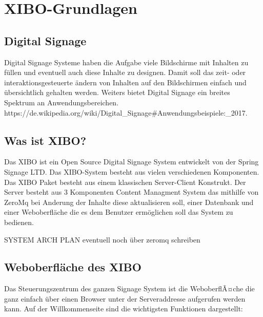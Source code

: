 \chapter{XIBO-Grundlagen}
\section{Digital Signage}\label{sec:digitalsignage}
Digital Signage Systeme haben die Aufgabe viele Bildschirme mit Inhalten zu füllen und eventuell auch diese Inhalte zu designen. Damit soll das zeit- oder interaktionsgesteuerte ändern von Inhalten auf den Bildschirmen einfach und übersichtlich gehalten werden. Weiters bietet Digital Signage ein breites Spektrum an Anwendungsbereichen.    https://de.wikipedia.org/wiki/Digital_Signage#Anwendungsbeispiele:_2017.

\section{Was ist XIBO?}\label{sec:xibo}
Das XIBO ist ein Open Source Digital Signage System entwickelt von der Spring Signage LTD. Das XIBO-System besteht aus vielen verschiedenen Komponenten. Das XIBO Paket besteht aus einem klassischen Server-Client Konstrukt. Der Server besteht aus 3 Komponenten Content Managment System das mithilfe von ZeroMq bei Anderung der Inhalte diese aktualisieren soll, einer Datenbank und einer Weboberfläche die es dem Benutzer ermöglichen soll das System zu bedienen.

SYSTEM ARCH PLAN eventuell noch über zeromq schreiben

\section{Weboberfläche des XIBO}\label{sec:webpagexibo}
Das Steuerungszentrum des ganzen Signage System ist die WeboberflÃ¤che die ganz einfach über einen Browser unter der Serveraddresse aufgerufen werden kann. Auf der Willkommenseite sind die wichtigsten Funktionen dargestellt:

